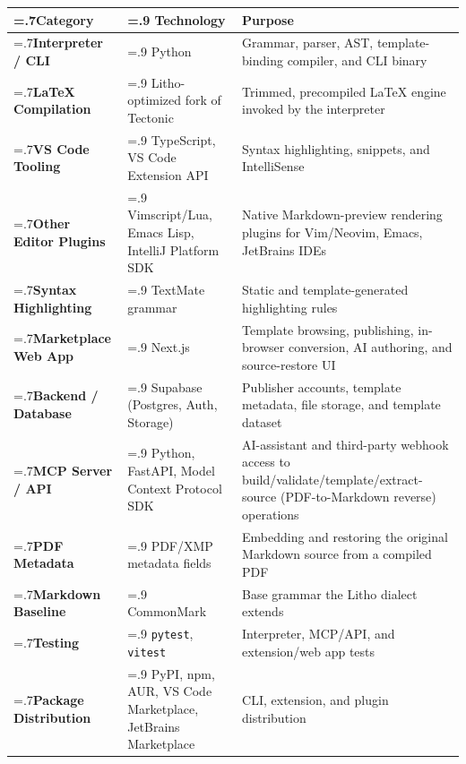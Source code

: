 \documentclass[a4paper,twoside]{article}
\begin{document}
\begin{table}[H]
  \centering
  \begin{tabularx}{\textwidth}{>{\raggedright\arraybackslash\hsize=.7\hsize}X >{\raggedright\arraybackslash\hsize=.9\hsize}X >{\raggedright\arraybackslash\hsize=1.4\hsize}X}
    \toprule
    \textbf{Category} & \textbf{Technology} & \textbf{Purpose} \\
    \midrule
    \textbf{Interpreter / CLI}     & Python                              & Grammar, parser, AST, template-binding compiler, and CLI binary \\
    \textbf{LaTeX Compilation}     & Litho-optimized fork of Tectonic~\cite{ref6} & Trimmed, precompiled LaTeX engine invoked by the interpreter \\
    \textbf{VS Code Tooling}       & TypeScript, VS Code Extension API   & Syntax highlighting, snippets, and IntelliSense \\
    \textbf{Other Editor Plugins}  & Vimscript/Lua, Emacs Lisp, IntelliJ Platform SDK & Native Markdown-preview rendering plugins for Vim/Neovim, Emacs, JetBrains IDEs \\
    \textbf{Syntax Highlighting}   & TextMate grammar                    & Static and template-generated highlighting rules \\
    \textbf{Marketplace Web App}   & Next.js                             & Template browsing, publishing, in-browser conversion, AI authoring, and source-restore UI \\
    \textbf{Backend / Database}    & Supabase (Postgres, Auth, Storage)  & Publisher accounts, template metadata, file storage, and template dataset \\
    \textbf{MCP Server / API}      & Python, FastAPI, Model Context Protocol SDK & AI-assistant and third-party webhook access to build/validate/template/extract-source (PDF-to-Markdown reverse) operations \\
    \textbf{PDF Metadata}          & PDF/XMP metadata fields             & Embedding and restoring the original Markdown source from a compiled PDF \\
    \textbf{Markdown Baseline}     & CommonMark~\cite{ref1}              & Base grammar the Litho dialect extends \\
    \textbf{Testing}               & \texttt{pytest}, \texttt{vitest}    & Interpreter, MCP/API, and extension/web app tests \\
    \textbf{Package Distribution}  & PyPI, npm, AUR, VS Code Marketplace, JetBrains Marketplace & CLI, extension, and plugin distribution \\

\end{tabularx}
\end{table}
\end{document}
